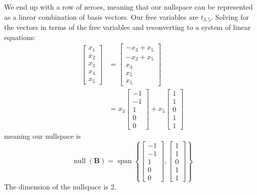 \documentclass[]{article}
\numberwithin{equation}{section}
\begin{document}
We end up with a row of zeroes, meaning that our nullspace can be represented as a linear combination of basis vectors. Our free variables are \(t_{3,5}\). Solving for the vectors in terms of the free variables and reconverting to a system of linear equations: 
\begin{align}
	\begin{bmatrix}
	x_1 \\
	x_2 \\
	x_3 \\
	x_4 \\
	x_5
	\end{bmatrix}
	&= 
	\begin{bmatrix}
	-x_3 + x_5 \\
	-x_3 + x_5 \\
	x_3 \\
	x_5 \\
	x_5
	\end{bmatrix} \\
	&= 
	x_3 \begin{bmatrix}
	-1 \\
	-1 \\
	1 \\
	0 \\
	0
	\end{bmatrix} + 
	x_5 \begin{bmatrix}
	1 \\
	1 \\
	0 \\
	1 \\
	1
	\end{bmatrix}
\end{align}
meaning our nullspace is 
\begin{equation}
	\operatorname{null}(\mathbf{B}) = \operatorname{span}\left\lbrace
	\begin{bmatrix}
	-1 \\
	-1 \\
	1 \\
	0 \\
	0
	\end{bmatrix}, 
	\begin{bmatrix}
	1 \\
	1 \\
	0 \\
	1 \\
	1
	\end{bmatrix}
	\right\rbrace
\end{equation}
The dimension of the nullspace is 2. 

\subsection{}
\end{document}

